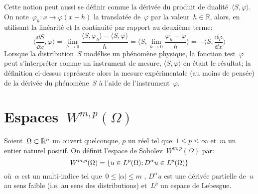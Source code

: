 \medskip
Cette notion peut aussi se définir comme la dérivée du produit de dualité~$\langle S,\varphi\rangle$.
On note~$\varphi_h:x\rightarrow\varphi(x-h)$ la translatée de~$\varphi$ par la valeur~$h\in{\mathbb R}$, alors, en utilisant la linéarité et la continuité par rapport au deuxième terme:
\begin{equation}
\langle\frac{\dd S}{\dd x},\varphi\rangle= \lim_{h\rightarrow 0}\frac{ \langle S,\varphi_h\rangle- \langle S,\varphi\rangle}{h}
= \langle S,\lim_{h\rightarrow 0} \frac{\varphi_h-\varphi}{h} \rangle= -\langle S,\frac{\dd\varphi}{\dd x}\rangle
\end{equation}
Lorsque la distribution~$S$ modélise un phénomène physique, la fonction test~$\varphi$ peut s'interpréter comme un instrument de mesure, $\langle S,\varphi\rangle$ en étant le résultat; la définition ci-dessus représente alors la mesure expérimentale (au moins de pensée) de la dérivée du phénomène~$S$ à l'aide de l'instrument~$\varphi$.

\medskip
{}





\medskip
\section{Espaces~$W^{m,p}(\Omega)$}

\begin{definition}
Soient~$\Omega \subset \mathbb R^n$ un ouvert quelconque, $p$ un réel tel que~$1\leqslant p\leqslant \infty$ et~$m$ un entier naturel positif.
On définit l'espace de Sobolev~$W^{m,p}(\Omega)$ par:
\begin{equation}\label{Eq-SoboW}\colorred
W^{m, p}(\Omega)=\{u\in L^p(\Omega); D^\alpha u \in L^p(\Omega)\}
\end{equation}
où~$\alpha$ est un multi-indice tel que~$0\leqslant |\alpha| \leqslant m$ , $D^\alpha u$ est une dérivée partielle de~$u$ au sens faible (i.e. au sens des distributions) et~$L^p$ un espace de Lebesgue.
\end{definition}

